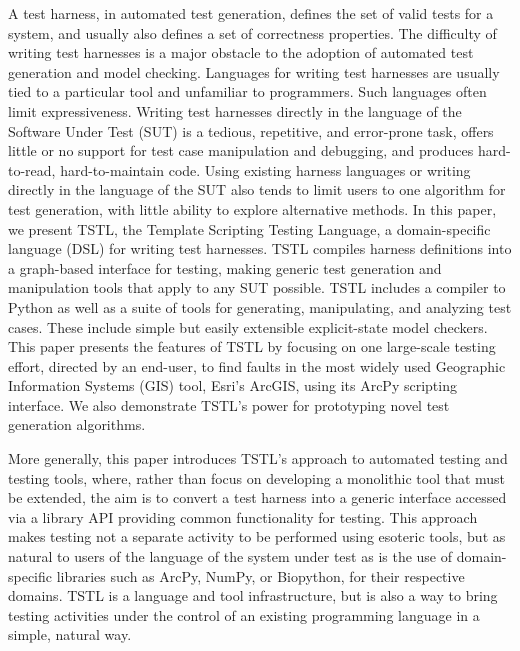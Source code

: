A test harness, in automated test generation, defines the set of valid tests
for a system, and usually also defines a set of correctness
properties.  The difficulty of writing test harnesses is a major
obstacle to the adoption of automated test generation and model
checking.  Languages for writing test harnesses are usually tied to a
particular tool and unfamiliar to programmers.  Such languages often limit
expressiveness.  Writing test harnesses directly in the language of
the Software Under Test (SUT) is a tedious, repetitive, and
error-prone task, offers little or no support for test case
manipulation and debugging, and produces hard-to-read, hard-to-maintain
code.  Using existing harness languages or writing directly in the
language of the SUT also tends to limit users to one algorithm for
test generation, with little ability to explore alternative methods.
In this paper, we present TSTL, the Template Scripting Testing
Language, a domain-specific language (DSL) for writing test harnesses.
TSTL compiles harness definitions into a graph-based
interface for testing, making generic
test generation and manipulation tools that apply to any SUT possible.  TSTL includes a
compiler to Python as well as a suite of tools for generating, manipulating,
and analyzing test cases.  These include simple but easily extensible explicit-state model
checkers.  This paper presents the features of TSTL by focusing on
one large-scale testing effort, directed by an end-user, to find
faults in the most widely used Geographic Information Systems (GIS) tool,
Esri's ArcGIS, using its ArcPy scripting interface.  We also
demonstrate TSTL's power for prototyping novel test generation
algorithms.  

More generally, this paper introduces TSTL's approach to automated
testing and testing tools, where, rather than focus on developing a
monolithic tool that must be extended, the aim is to convert a test
harness into a generic interface accessed via a library API providing
common functionality for testing.  This approach makes testing not a
separate activity to be performed using esoteric tools, but as natural
to users of the language of the system under test as is the use of
domain-specific libraries such as ArcPy, NumPy, or Biopython, for
their respective domains.
TSTL is a language and tool infrastructure, but is also a way to bring testing activities
under the control of an existing programming language in a simple,
natural way.



